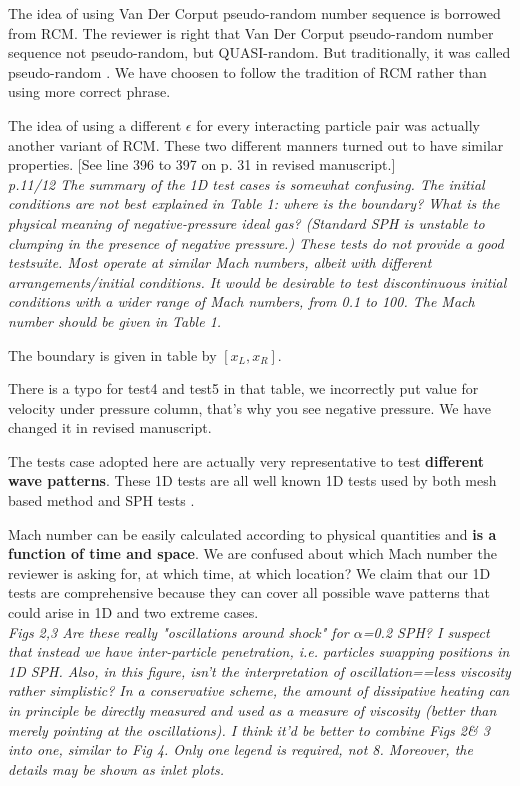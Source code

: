 \documentclass[10pt,a4paper]{article}
\begin{document}
The idea of using Van Der Corput pseudo-random number sequence is borrowed from RCM. The reviewer is right that Van Der Corput pseudo-random number sequence not pseudo-random, but QUASI-random. But traditionally, it was called pseudo-random \citep[][e.g.]{toro2013riemann}. We have choosen to follow the tradition of RCM rather than using more correct phrase.

The idea of using a different $\epsilon$ for every interacting particle pair was actually another variant of RCM. These two different manners turned out to have similar properties. 
[See line 396 to 397 on p. 31 in revised manuscript.]
\\[3pt]

\textit{p.11/12 The summary of the 1D test cases is somewhat confusing. The initial conditions are not best explained in Table 1: where is the boundary? What is the physical meaning of negative-pressure ideal gas? (Standard SPH is unstable to clumping in the presence of negative pressure.)
These tests do not provide a good testsuite. Most operate at similar Mach numbers, albeit with different arrangements/initial conditions. It would
be desirable to test discontinuous initial conditions with a wider range of Mach numbers, from 0.1 to 100. The Mach number should be given in Table 1.}

The boundary is given in table by $[x_L, x_R]$.

There is a typo for test4 and test5 in that table, we incorrectly put value for velocity under pressure column, that's why you see negative pressure. We have changed it in revised manuscript.

The tests case adopted here are actually very representative to test \textbf{different wave patterns}. These 1D tests are all well known 1D tests used by both mesh based method \citep[][e.g.]{toro2013riemann, leveque2002finite} and SPH tests \citep[][e.g.]{monaghan1983shock, cha2003implementations, puri2014approximate}.

Mach number can be easily calculated according to physical quantities and \textbf{is a function of time and space}. We are confused about which Mach number the reviewer is asking for, at which time, at which location?
We claim that our 1D tests are comprehensive because they can cover all possible wave patterns that could arise in 1D and two extreme cases.
\\[3pt]

\textit{Figs 2,3 Are these really "oscillations around shock" for $\alpha$=0.2 SPH? I suspect that instead we have inter-particle penetration, i.e.
particles swapping positions in 1D SPH. Also, in this figure, isn't the interpretation of oscillation==less viscosity rather simplistic? In a conservative scheme, the amount of dissipative heating can in principle be directly measured and used as a measure of viscosity (better than merely pointing at the oscillations).
I think it'd be better to combine Figs 2\& 3 into one, similar to Fig 4. Only one legend is required, not 8. Moreover, the details may be shown as inlet plots.}
\end{document}
